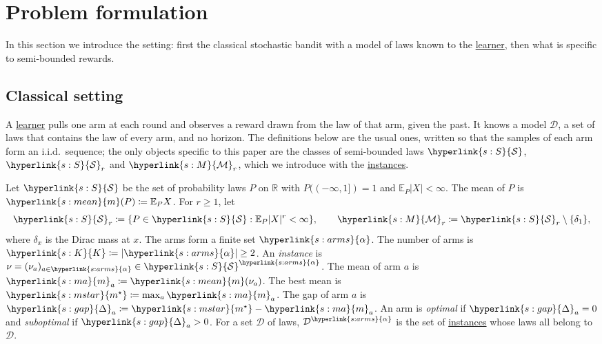 \documentclass[11pt]{article}
\newcommand{\E}{\mathbb{E}}
\newcommand{\R}{\mathbb{R}}
\newcommand{\dt}[1]{\hypertarget{#1}{}}
\newcommand{\sy}[2]{{\hyperlink{#1}{#2}}}
\newcommand{\term}[2]{\hyperlink{#1}{#2}}
\newcommand{\Sm}{\sy{s:S}{\mathcal{S}}}
\newcommand{\Mm}{\sy{s:M}{\mathcal{M}}}
\newcommand{\mean}{\sy{s:mean}{m}}
\newcommand{\arms}{\sy{s:arms}{\alpha}}
\newcommand{\Karms}{\sy{s:K}{K}}
\newcommand{\marm}{\sy{s:ma}{m}}
\newcommand{\ms}{\sy{s:mstar}{m^{\star}}}
\newcommand{\gap}{\sy{s:gap}{\Delta}}
\begin{document}
\section{Problem formulation}\label{sec:setting}

In this section we introduce the setting: first the classical stochastic bandit with a model of
laws known to the \term{w:learner}{learner}, then what is specific to semi-bounded rewards.

\subsection{Classical setting}

A \term{w:learner}{learner} pulls one arm at each round and observes a reward drawn from the law of that arm, given
the past. It knows a model $\mathcal D$, a set of laws that contains the law of every arm, and no
horizon. The definitions below are the usual ones, written so that the samples of each arm form an
i.i.d.\ sequence; the only objects specific to this paper are the classes of semi-bounded laws
$\Sm$, $\Sm_r$ and $\Mm_r$, which we introduce with the \term{w:instance}{instances}.

\begin{definition}\label{def:model}
\dt{s:S}Let $\Sm$ be the set of probability laws $P$ on $\R$ with $P((-\infty,1])=1$ and
$\E_P|X|<\infty$. \dt{s:mean}The mean of $P$ is $\mean(P)\coloneqq\E_PX$. \dt{s:M}For $r\ge1$, let
\begin{equation*}
  \Sm_r\coloneqq\{P\in\Sm:\E_P|X|^r<\infty\},\qquad\Mm_r\coloneqq\Sm_r\setminus\{\delta_1\},
\end{equation*}
where $\delta_x$ is the Dirac mass at $x$. \dt{s:arms}The arms form a finite set $\arms$.
\dt{s:K}The number of arms is $\Karms\coloneqq|\arms|\ge2$. \dt{w:instance}An \emph{instance} is
$\nu=(\nu_a)_{a\in\arms}\in\Sm^\arms$. \dt{s:ma}The mean of arm $a$ is $\marm_a\coloneqq \mean(\nu_a)$.
\dt{s:mstar}The best mean is $\ms\coloneqq\max_a\marm_a$. \dt{s:gap}The gap of arm $a$ is
$\gap_a\coloneqq\ms-\marm_a$. \dt{w:optimal}An arm is \emph{optimal} if $\gap_a=0$
\dt{w:subopt}and \emph{suboptimal} if $\gap_a>0$. For a set $\mathcal D$ of laws, $\mathcal D^\arms$
is the set of \term{w:instance}{instances} whose laws all belong to $\mathcal D$.
\end{definition}
\end{document}
